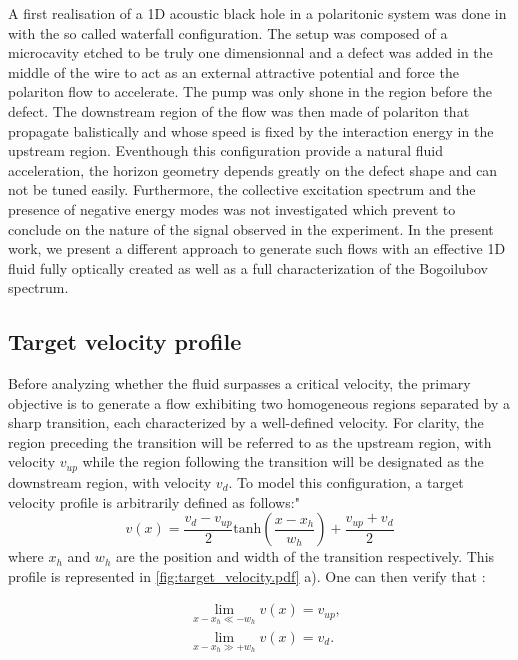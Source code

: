 A first realisation of a 1D acoustic black hole in a polaritonic system was done in \cite{nguyen_acoustic_2015} with the so called waterfall configuration. 
The setup was composed of a microcavity etched to be truly one dimensionnal and a defect was added in the middle of the wire to act as an external attractive potential and force the polariton flow to accelerate. The pump was only shone in the region before the defect. The downstream region of the flow was then made of polariton that propagate balistically and whose speed is fixed by the interaction energy
in the upstream region.
Eventhough this configuration provide a natural fluid acceleration, the horizon geometry depends greatly on the defect shape and can not be tuned easily.  Furthermore, the collective excitation spectrum and the presence of negative energy modes was not investigated which 
prevent to conclude on the nature of the signal observed in the experiment. In the present work, we present a different approach to generate such flows with an effective 1D fluid fully optically created as well as a full characterization of the Bogoilubov spectrum.

\subsection{Target velocity profile}
Before analyzing whether the fluid surpasses a critical velocity, the primary objective is to generate a flow exhibiting two homogeneous regions separated by a sharp transition, each characterized by a well-defined velocity. For clarity, the region preceding the transition will be referred to as the upstream region, with velocity $v_{up}$ while the region following the transition will be designated as the downstream region, with velocity $v_{d}$.
To model this configuration, a target velocity profile is arbitrarily defined as follows:"
\begin{equation}
    v(x)= \frac{v_{d}-v_{up}}{2}\mathrm{tanh}(\frac{x-x_h}{w_h})+\frac{v_{up}+v_{d}}{2}
    \label{eq:target_velocity}
\end{equation}
where $x_h$ and $w_h$ are the position and width of the transition respectively. This profile is represented in \autoref{fig:target_velocity.pdf} a).
One can then verify that :

\begin{subequations}
    \begin{align}
    &\lim\limits_{x-x_h\ll-w_h} v(x) = v_{up},\\
    &\lim\limits_{x-x_h\gg+w_h} v(x) = v_{d}.
    \end{align}
\end{subequations}

